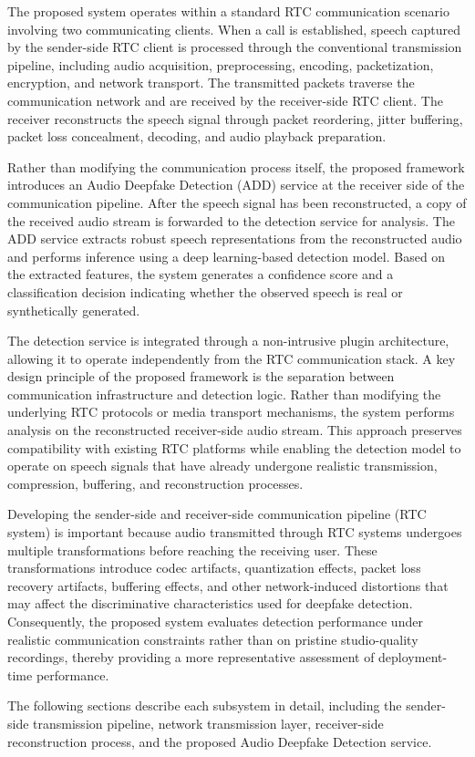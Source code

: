 The proposed system operates within a standard RTC communication scenario involving two communicating clients. When a call is established, speech captured by the sender-side RTC client is processed through the conventional transmission pipeline, including audio acquisition, preprocessing, encoding, packetization, encryption, and network transport. The transmitted packets traverse the communication network and are received by the receiver-side RTC client. The receiver reconstructs the speech signal through packet reordering, jitter buffering, packet loss concealment, decoding, and audio playback preparation.

Rather than modifying the communication process itself, the proposed framework introduces an Audio Deepfake Detection (ADD) service at the receiver side of the communication pipeline. After the speech signal has been reconstructed, a copy of the received audio stream is forwarded to the detection service for analysis. The ADD service extracts robust speech representations from the reconstructed audio and performs inference using a deep learning-based detection model. Based on the extracted features, the system generates a confidence score and a classification decision indicating whether the observed speech is real or synthetically generated.

The detection service is integrated through a non-intrusive plugin architecture, allowing it to operate independently from the RTC communication stack. A key design principle of the proposed framework is the separation between communication infrastructure and detection logic. Rather than modifying the underlying RTC protocols or media transport mechanisms, the system performs analysis on the reconstructed receiver-side audio stream. This approach preserves compatibility with existing RTC platforms while enabling the detection model to operate on speech signals that have already undergone realistic transmission, compression, buffering, and reconstruction processes.

Developing the sender-side and receiver-side communication pipeline (RTC system) is important because audio transmitted through RTC systems undergoes multiple transformations before reaching the receiving user. These transformations introduce codec artifacts, quantization effects, packet loss recovery artifacts, buffering effects, and other network-induced distortions that may affect the discriminative characteristics used for deepfake detection. Consequently, the proposed system evaluates detection performance under realistic communication constraints rather than on pristine studio-quality recordings, thereby providing a more representative assessment of deployment-time performance.

The following sections describe each subsystem in detail, including the sender-side transmission pipeline, network transmission layer, receiver-side reconstruction process, and the proposed Audio Deepfake Detection service.
